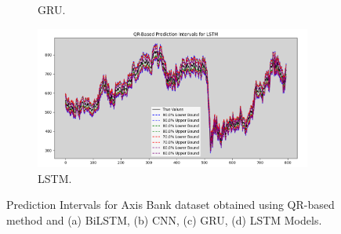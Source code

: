 \begin{figure}[H]
\begin{minipage}{0.6\textwidth}
\begin{subfigure}[b]{1.0\textwidth}
                \caption{GRU.}
            \end{subfigure}
            \begin{subfigure}[b]{1.0\textwidth}
                \centering
                \includegraphics[width=\textwidth]{Chap02/figs/QR_LSTM_AxisBank.png}
                \caption{LSTM.}
            \end{subfigure}
        \end{minipage}
    
    \caption{Prediction Intervals for Axis Bank dataset obtained using QR-based method and (a) BiLSTM, (b) CNN, (c) GRU, (d) LSTM Models.}
    \label{Fi 3.4}
\end{figure}

